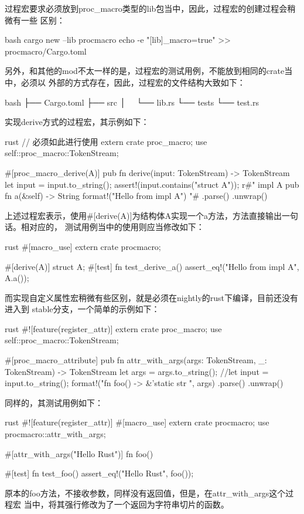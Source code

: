 过程宏要求必须放到proc\_macro类型的lib包当中，因此，过程宏的创建过程会稍微有一些
区别：
\begin{code-block}{bash}
cargo new --lib procmacro
echo -e "[lib]\nproc_macro=true" >> procmacro/Cargo.toml
\end{code-block}

另外，和其他的mod不太一样的是，过程宏的测试用例，不能放到相同的crate当中，必须以
外部的方式存在，因此，过程宏的文件结构大致如下：
\begin{code-block}{bash}
├── Cargo.toml
├── src
│   └── lib.rs
└── tests
    └── test.rs
\end{code-block}

实现derive方式的过程宏，其示例如下：
\begin{code-block}{rust}
// 必须如此进行使用
extern crate proc_macro;
use self::proc_macro::TokenStream;

#[proc_macro_derive(A)]
pub fn derive(input: TokenStream) -> TokenStream {
    let input = input.to_string();
    assert!(input.contains("struct A"));
    r#"
        impl A {
            pub fn a(&self) -> String {
                format!("Hello from impl A")
            }
        }
    "#
    .parse()
    .unwrap()
}
\end{code-block}
上述过程宏表示，使用\#[derive(A)]为结构体A实现一个a方法，方法直接输出一句话。相对应的，
测试用例当中的使用则应当修改如下：
\begin{code-block}{rust}
#[macro_use]
extern crate procmacro;

#[derive(A)]
struct A;
#[test]
fn test_derive_a() {
    assert_eq!("Hello from impl A", A.a());
}
\end{code-block}

而实现自定义属性宏稍微有些区别，就是必须在nightly的rust下编译，目前还没有进入到
stable分支，一个简单的示例如下：
\begin{code-block}{rust}
#![feature(register_attr)]
extern crate proc_macro;
use self::proc_macro::TokenStream;

#[proc_macro_attribute]
pub fn attr_with_args(args: TokenStream, _: TokenStream) -> TokenStream {
    let args = args.to_string();
    //let input = input.to_string();
    format!("fn foo() -> &'static str {{{}}}", args)
        .parse()
        .unwrap()
}
\end{code-block}
同样的，其测试用例如下：
\begin{code-block}{rust}
#![feature(register_attr)]
#[macro_use]
extern crate procmacro;
use procmacro::attr_with_args;

#[attr_with_args("Hello Rust")]
fn foo() {}

#[test]
fn test_foo() {
    assert_eq!("Hello Rust", foo());
}
\end{code-block}
原本的foo方法，不接收参数，同样没有返回值，但是，在attr\_with\_args这个过程宏
当中，将其强行修改为了一个返回为字符串切片的函数。

